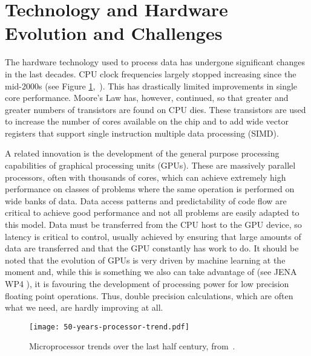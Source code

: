 \section{Technology and Hardware Evolution and Challenges}


The hardware technology used to process data has undergone significant changes in the last decades. CPU clock frequencies largely stopped increasing since the mid-2000s (see Figure \ref{figures:Fig5},~\cite{KRupp_Microprocessor_Data}). This has drastically limited improvements in single core performance. Moore's Law has, however, continued, so that greater and greater numbers of transistors are found on CPU dies. These transistors are used to increase the number of cores available on the chip and to add wide vector registers that support single instruction multiple data processing (SIMD).

A related innovation is the development of the general purpose processing capabilities of graphical processing units (GPUs). These are massively parallel processors, often with thousands of cores, which can achieve extremely high performance on classes of problems where the same operation is performed on wide banks of data. Data access patterns and predictability of code flow are critical to achieve good performance and not all problems are easily adapted to this model. Data must be transferred from the CPU host to the GPU device, so latency is critical to control, usually achieved by ensuring that large amounts of data are transferred and that the GPU constantly has work to do. It should be noted that the evolution of GPUs is very driven by machine learning at the moment and, while this is something we also can take advantage of (see JENA WP4 \cite{JENA_WG_Reports}), it is favouring the development of processing power for low precision floating point operations. Thus, double precision calculations, which are often what we need, are hardly improving at all.

\begin{figure}[htbp]
    \begin{center}
        \texttt{[image: 50-years-processor-trend.pdf]} \\ 
        \caption{Microprocessor trends over the last half century, from~\cite{KRupp_Microprocessor_Data}.}
        \label{figures:Fig5}
    \end{center}
\end{figure}


